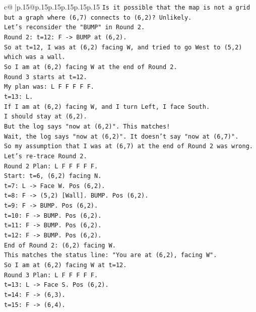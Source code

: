 \documentclass{article}
\begin{document}
{\begin{supertabular}{c@{$\;$}|p{.15\linewidth}@{}p{.15\linewidth}p{.15\linewidth}p{.15\linewidth}p{.15\linewidth}p{.15\linewidth}}
{{{\texttt{Is it possible that the map is not a grid but a graph where (6,7) connects to (6,2)? Unlikely.} \\
\texttt{Let's reconsider the "BUMP" in Round 2.} \\
\texttt{Round 2: t=12: F {-}> BUMP at (6,2).} \\
\texttt{So at t=12, I was at (6,2) facing W, and tried to go West to (5,2) which was a wall.} \\
\texttt{So I am at (6,2) facing W at the end of Round 2.} \\
\texttt{Round 3 starts at t=12.} \\
\texttt{My plan was: L F F F F F.} \\
\texttt{t=13: L.} \\
\texttt{If I am at (6,2) facing W, and I turn Left, I face South.} \\
\texttt{I should stay at (6,2).} \\
\texttt{But the log says "now at (6,2)". This matches!} \\
\texttt{Wait, the log says "now at (6,2)". It doesn't say "now at (6,7)".} \\
\texttt{So my assumption that I was at (6,7) at the end of Round 2 was wrong.} \\
\texttt{Let's re{-}trace Round 2.} \\
\texttt{Round 2 Plan: L F F F F F.} \\
\texttt{Start: t=6, (6,2) facing N.} \\
\texttt{t=7: L {-}> Face W. Pos (6,2).} \\
\texttt{t=8: F {-}> (5,2) {[}Wall{]}. BUMP. Pos (6,2).} \\
\texttt{t=9: F {-}> BUMP. Pos (6,2).} \\
\texttt{t=10: F {-}> BUMP. Pos (6,2).} \\
\texttt{t=11: F {-}> BUMP. Pos (6,2).} \\
\texttt{t=12: F {-}> BUMP. Pos (6,2).} \\
\texttt{End of Round 2: (6,2) facing W.} \\
\texttt{This matches the status line: "You are at (6,2), facing W".} \\
\texttt{So I am at (6,2) facing W at t=12.} \\
\texttt{Round 3 Plan: L F F F F F.} \\
\texttt{t=13: L {-}> Face S. Pos (6,2).} \\
\texttt{t=14: F {-}> (6,3).} \\
\texttt{t=15: F {-}> (6,4).} \\
}}}
\end{supertabular}}
\end{document}
